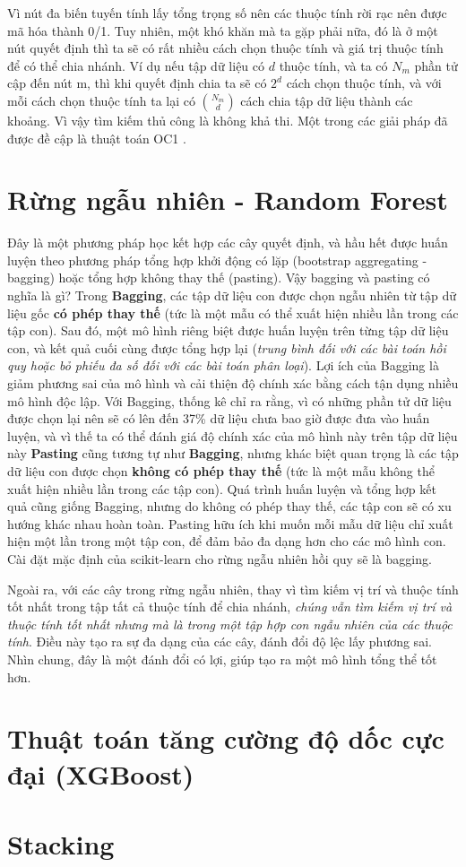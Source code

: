 Vì nút đa biến tuyến tính lấy tổng trọng số nên các thuộc tính rời rạc nên được mã hóa thành 0/1.
Tuy nhiên, một khó khăn mà ta gặp phải nữa, đó là ở một nút quyết định thì ta sẽ có rất nhiều cách chọn thuộc tính và giá trị thuộc tính để có thể chia nhánh. Ví dụ nếu tập dữ liệu có $d$ thuộc tính, và ta có $N_m$ phần tử cập đến nút m, thì khi quyết định chia ta sẽ có $2^d$ cách chọn thuộc tính, và với mỗi cách chọn thuộc tính ta lại có $\binom{N_m}{d}$ cách chia tập dữ liệu thành các khoảng. Vì vậy tìm kiếm thủ công là không khả thi. Một trong các giải pháp đã được đề cập là thuật toán OC1 \cite{Murthy1993oc1}.

\section{Rừng ngẫu nhiên - Random Forest}
Đây là một phương pháp học kết hợp các cây quyết định, và hầu hết được huấn luyện theo phương pháp tổng hợp khởi động có lặp (bootstrap aggregating - bagging) hoặc tổng hợp không thay thế (pasting). Vậy bagging và pasting có nghĩa là gì?
Trong \textbf{Bagging}, các tập dữ liệu con được chọn ngẫu nhiên từ tập dữ liệu gốc \textbf{có phép thay thế} (tức là một mẫu có thể xuất hiện nhiều lần trong các tập con). Sau đó, một mô hình riêng biệt được huấn luyện trên từng tập dữ liệu con, và kết quả cuối cùng được tổng hợp lại (\textit{trung bình đối với các bài toán hồi quy hoặc bỏ phiếu đa số đối với các bài toán phân loại}).
Lợi ích của Bagging là giảm phương sai của mô hình và cải thiện độ chính xác bằng cách tận dụng nhiều mô hình độc lập. Với Bagging, thống kê chỉ ra rằng, vì có những phần tử dữ liệu được chọn lại nên sẽ có lên đến 37\% dữ liệu chưa bao giờ được đưa vào huấn luyện\cite{aurelien2019handsonml}, và vì thế ta có thể đánh giá độ chính xác của mô hình này trên tập dữ liệu này 
\textbf{Pasting} cũng tương tự như \textbf{Bagging}, nhưng khác biệt quan trọng là các tập dữ liệu con được chọn \textbf{không có phép thay thế} (tức là một mẫu không thể xuất hiện nhiều lần trong các tập con). Quá trình huấn luyện và tổng hợp kết quả cũng giống Bagging, nhưng do không có phép thay thế, các tập con sẽ có xu hướng khác nhau hoàn toàn.
Pasting hữu ích khi muốn mỗi mẫu dữ liệu chỉ xuất hiện một lần trong một tập con, để đảm bảo đa dạng hơn cho các mô hình con.
Cài đặt mặc định của scikit-learn cho rừng ngẫu nhiên hồi quy sẽ là bagging\cite{aurelien2019handsonml}.

Ngoài ra, với các cây trong rừng ngẫu nhiên, thay vì tìm kiếm vị trí và thuộc tính tốt nhất trong tập tất cả thuộc tính để chia nhánh, \textit{chúng vẫn tìm kiếm vị trí và thuộc tính tốt nhất nhưng mà là trong một tập hợp con ngẫu nhiên của các thuộc tính}. Điều này tạo ra sự đa dạng của các cây, đánh đổi độ lệc lấy phương sai. Nhìn chung, đây là một đánh đổi có lợi, giúp tạo ra một mô hình tổng thể tốt hơn.

\section{Thuật toán tăng cường độ dốc cực đại (XGBoost)}

\section{Stacking}